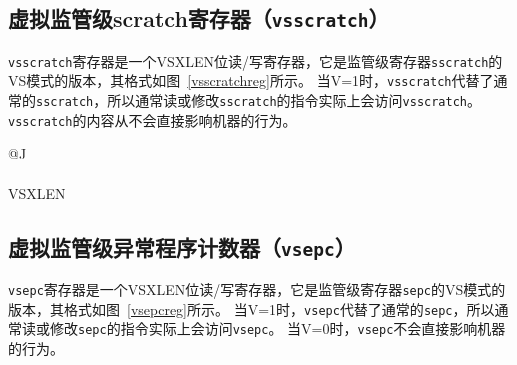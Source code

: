 \subsection{虚拟监管级scratch寄存器（{\tt vsscratch}）}

{\tt vsscratch}寄存器是一个VSXLEN位读/写寄存器，它是监管级寄存器{\tt sscratch}的VS模式的版本，其格式如图~\ref{vsscratchreg}所示。
当V=1时，{\tt vsscratch}代替了通常的{\tt sscratch}，所以通常读或修改{\tt sscratch}的指令实际上会访问{\tt vsscratch}。
{\tt vsscratch}的内容从不会直接影响机器的行为。

\begin{figure*}[h!]
{\footnotesize
\begin{center}
\begin{tabular}{@{}J}
 \\
\hline
{} \\
\hline
VSXLEN \\
\end{tabular}
\end{center}
}
\vspace{-0.1in}
\caption{虚拟监管级scratch寄存器（{\tt vsscratch}）
  }
\label{vsscratchreg}
\end{figure*}

\subsection{虚拟监管级异常程序计数器（{\tt vsepc}）}

{\tt vsepc}寄存器是一个VSXLEN位读/写寄存器，它是监管级寄存器{\tt sepc}的VS模式的版本，其格式如图~\ref{vsepcreg}所示。
当V=1时，{\tt vsepc}代替了通常的{\tt sepc}，所以通常读或修改{\tt sepc}的指令实际上会访问{\tt vsepc}。
当V=0时，{\tt vsepc}不会直接影响机器的行为。

